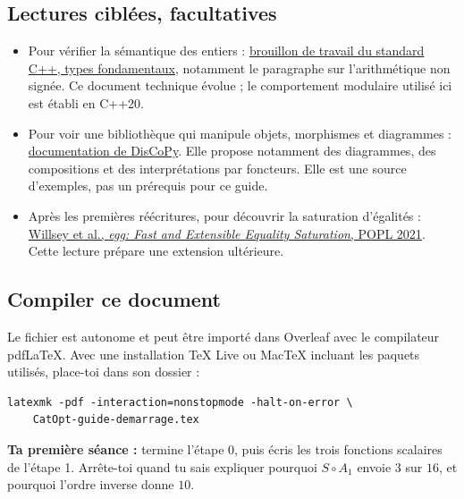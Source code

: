 \documentclass[11pt,a4paper]{article}
\newcommand{\code}[1]{\texttt{\detokenize{#1}}}
\begin{document}
\subsection{Lectures ciblées, facultatives}
\begin{itemize}
\item Pour vérifier la sémantique des entiers :
\href{https://eel.is/c++draft/basic.fundamental}{brouillon de travail du standard C++, types fondamentaux},
notamment le paragraphe sur l'arithmétique non signée. Ce document technique
évolue ; le comportement modulaire utilisé ici est établi en C++20.
\item Pour voir une bibliothèque qui manipule objets, morphismes et
diagrammes : \href{https://docs.discopy.org/en/main/index.html}{documentation de DisCoPy}.
Elle propose notamment des diagrammes, des compositions et des interprétations
par foncteurs. Elle est une source d'exemples, pas un prérequis pour ce guide.
\item Après les premières réécritures, pour découvrir la saturation d'égalités :
\href{https://www.mwillsey.com/papers/egg}{Willsey et al., \emph{egg: Fast and Extensible Equality Saturation}, POPL 2021}.
Cette lecture prépare une extension ultérieure.
\end{itemize}

\subsection{Compiler ce document}
Le fichier \code{CatOpt-guide-demarrage.tex} est autonome et peut être
importé dans Overleaf avec le compilateur pdfLaTeX. Avec une installation
TeX Live ou MacTeX incluant les paquets utilisés, place-toi dans son dossier :
\begin{lstlisting}[style=plain]
latexmk -pdf -interaction=nonstopmode -halt-on-error \
    CatOpt-guide-demarrage.tex
\end{lstlisting}

\textbf{Ta première séance :} termine l'étape 0, puis écris les trois
fonctions scalaires de l'étape 1. Arrête-toi quand tu sais expliquer pourquoi
\(S\circ A_1\) envoie \(3\) sur \(16\), et pourquoi l'ordre inverse donne \(10\).
\end{document}
